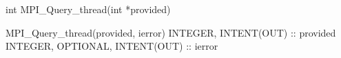 int MPI_Query_thread(int *provided)

MPI_Query_thread(provided, ierror)
INTEGER, INTENT(OUT) :: provided
INTEGER, OPTIONAL, INTENT(OUT) :: ierror

